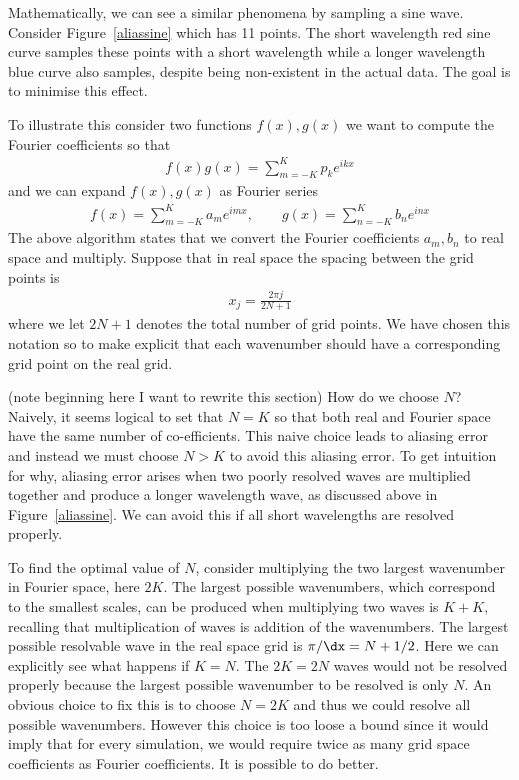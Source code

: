 Mathematically, we can see a similar phenomena by sampling a sine wave. Consider Figure~\ref{aliassine} which has 11 points. The short wavelength red sine curve samples these points with a short wavelength while a longer wavelength blue curve also samples, despite being non-existent in the actual data. The goal is to minimise this effect. 

To illustrate this consider two functions $f(x),g(x)$ we want to compute the Fourier coefficients so that
\begin{align}
f(x)g(x) = \sum_{m=-K}^{K} p_{k}e^{ikx}
\end{align}
and we can expand $f(x),g(x)$ as Fourier series
\begin{align}
f(x) = \sum_{m=-K}^{K}a_{m}e^{imx}, \qquad g(x) = \sum_{n=-K}^{K}b_{n}e^{inx}
\end{align}
The above algorithm states that we convert the Fourier coefficients $a_{m},b_{n}$ to real space and multiply. Suppose that in real space the spacing between the grid points is
\begin{align}
x_{j} = \frac{2\pi j}{2N+1}
\end{align}
where we let $2N+1$ denotes the total number of grid points. We have chosen this notation so to make explicit that each wavenumber should have a corresponding grid point on the real grid. 

(note beginning here I want to rewrite this section)
How do we choose $N$? Naively, it seems logical to set that $N=K$ so that both real and Fourier space have the same number of co-efficients. This naive choice leads to aliasing error and instead we must choose $N>K$ to avoid this aliasing error. To get intuition for why, aliasing error arises when two poorly resolved waves are multiplied together and produce a longer wavelength wave, as discussed above in Figure~\ref{aliassine}. We can avoid this if all short wavelengths are resolved properly.

To find the optimal value of $N$, consider multiplying the two largest wavenumber in Fourier space, here $2K$. The largest possible wavenumbers, which correspond to the smallest scales, can be produced when multiplying two waves is $K+K$, recalling that multiplication of waves is addition of the wavenumbers. The largest possible resolvable wave in the real space grid is $\pi/\dx=N+1/2$. Here we can explicitly see what happens if $K=N$. The $2K=2N$ waves would not be resolved properly because the largest possible wavenumber to be resolved is only $N$. An obvious choice to fix this is to choose $N=2K$ and thus we could resolve all possible wavenumbers. However this choice is too loose a bound since it would imply that for every simulation, we would require twice as many grid space coefficients as Fourier coefficients. It is possible to do better. 

